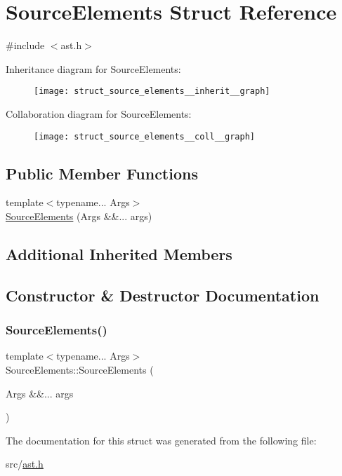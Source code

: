 \hypertarget{struct_source_elements}{}\section{Source\+Elements Struct Reference}
\label{struct_source_elements}


{\ttfamily \#include $<$ast.\+h$>$}



Inheritance diagram for Source\+Elements\+:\nopagebreak
\begin{figure}[H]
\begin{center}
\leavevmode
\texttt{[image: struct\_source\_elements\_\_inherit\_\_graph]}
\end{center}
\end{figure}


Collaboration diagram for Source\+Elements\+:\nopagebreak
\begin{figure}[H]
\begin{center}
\leavevmode
\texttt{[image: struct\_source\_elements\_\_coll\_\_graph]}
\end{center}
\end{figure}
\subsection*{Public Member Functions}
\begin{DoxyCompactItemize}
\item 
{\footnotesize template$<$typename... Args$>$ }\\\hyperlink{struct_source_elements_a1f7065c95d241407e691f198c8dd9b19}{Source\+Elements} (Args \&\&... args)
\end{DoxyCompactItemize}
\subsection*{Additional Inherited Members}


\subsection{Constructor \& Destructor Documentation}
\mbox{\label{struct_source_elements_a1f7065c95d241407e691f198c8dd9b19}} 
\subsubsection{\texorpdfstring{Source\+Elements()}{SourceElements()}}
{\footnotesize\ttfamily template$<$typename... Args$>$ \\
Source\+Elements\+::\+Source\+Elements (\begin{DoxyParamCaption}\item[{Args \&\&...}]{args }\end{DoxyParamCaption})\hspace{0.3cm}{\ttfamily [inline]}}



The documentation for this struct was generated from the following file\+:\begin{DoxyCompactItemize}
\item 
src/\hyperlink{ast_8h}{ast.\+h}\end{DoxyCompactItemize}
